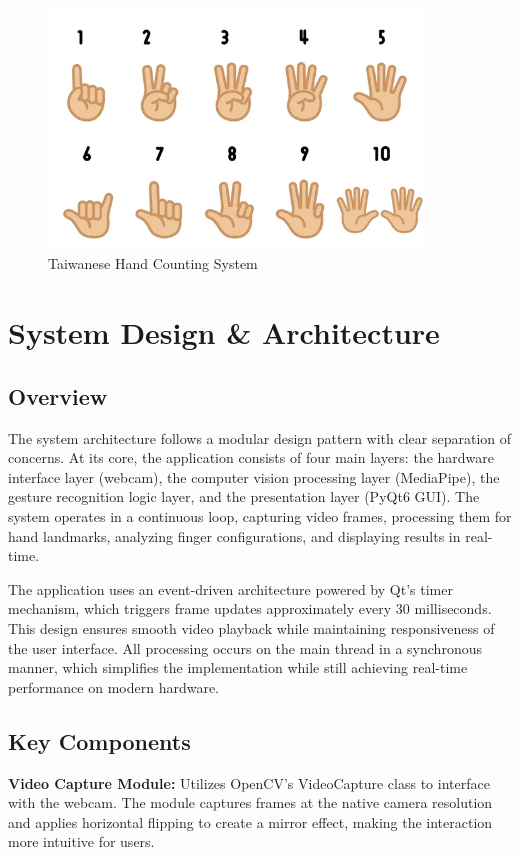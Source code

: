 \documentclass{article}
\begin{document}
\begin{figure}[H]
\centering
	\includegraphics[width=10cm]{taiwanese-hand-sign-clip-art-600nw-2462483897.png}
	\caption{Taiwanese Hand Counting System}
\end{figure}

\section{System Design \& Architecture}

\subsection{Overview}

The system architecture follows a modular design pattern with clear separation of concerns. At its core, the application consists of four main layers: the hardware interface layer (webcam), the computer vision processing layer (MediaPipe), the gesture recognition logic layer, and the presentation layer (PyQt6 GUI). The system operates in a continuous loop, capturing video frames, processing them for hand landmarks, analyzing finger configurations, and displaying results in real-time.

The application uses an event-driven architecture powered by Qt's timer mechanism, which triggers frame updates approximately every 30 milliseconds. This design ensures smooth video playback while maintaining responsiveness of the user interface. All processing occurs on the main thread in a synchronous manner, which simplifies the implementation while still achieving real-time performance on modern hardware.

\subsection{Key Components}

\textbf{Video Capture Module:} Utilizes OpenCV's VideoCapture class to interface with the webcam. The module captures frames at the native camera resolution and applies horizontal flipping to create a mirror effect, making the interaction more intuitive for users.
\end{document}
